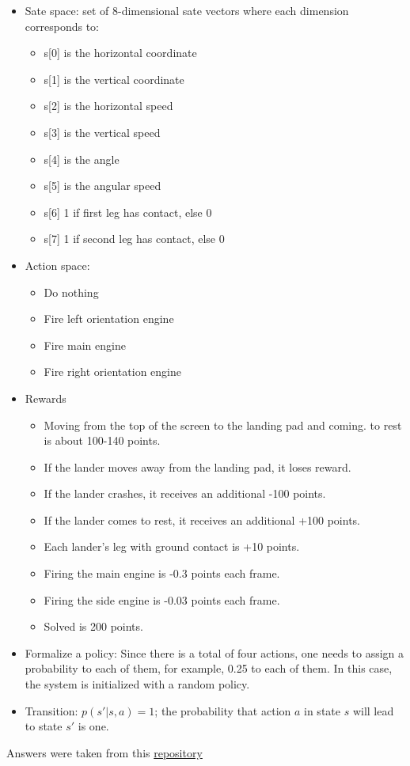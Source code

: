 \documentclass[a4paper,12pt]{scrartcl}
\begin{document}
\begin{itemize}

\item Sate space: set of 8-dimensional sate vectors where each dimension corresponds to:
\begin{itemize}
    \item s[0] is the horizontal coordinate
    \item s[1] is the vertical coordinate
    \item s[2] is the horizontal speed
    \item s[3] is the vertical speed
    \item s[4] is the angle
    \item s[5] is the angular speed
    \item s[6] 1 if first leg has contact, else 0
    \item s[7] 1 if second leg has contact, else 0
\end{itemize}
\item Action space:
\begin{itemize}
    \item Do nothing
    \item Fire left orientation engine
    \item Fire main engine
    \item Fire right orientation engine

\end{itemize}
\item Rewards
\begin{itemize}
    \item Moving from the top of the screen to the landing pad and coming.
    to rest is about 100-140 points.
    \item If the lander moves away from the landing pad, it loses reward.
    \item If the lander crashes, it receives an additional -100 points.
    \item If the lander comes to rest, it receives an additional +100 points.
    \item Each lander's leg with ground contact is +10 points.
    \item Firing the main engine is -0.3 points each frame.
    \item Firing the side engine is -0.03 points each frame.
    \item Solved is 200 points.
\end{itemize}
\item{Formalize a policy:}
Since there is a total of four actions, one needs to assign a probability to each of them, for example, 0.25 to each of them. In this case, the system is initialized with a random policy.
\item{Transition:}
$p(s'|s,a) = 1$; the probability that action $a$ in state $s$ will lead to state $s'$ is one.

\end{itemize}
Answers were taken from this \href{https://github.com/openai/gym/blob/master/gym/envs/box2d/lunar_lander.py} {repository}
\end{document}
